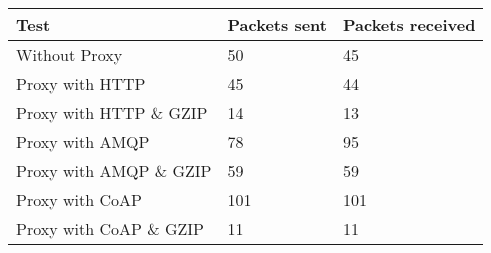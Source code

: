 \begin{tabular}{|l|l|l|}
\hline
\textbf{Test} & \textbf{Packets sent} & \textbf{Packets received} \\ \hline
Without Proxy                    &50         & 45        \\ \hline 
Proxy with HTTP                  &45         & 44        \\ \hline 
Proxy with HTTP \& GZIP          &14         & 13        \\ \hline 
Proxy with AMQP                  &78         & 95        \\ \hline 
Proxy with AMQP \& GZIP          &59         & 59        \\ \hline 
Proxy with CoAP                  &101        & 101       \\ \hline 
Proxy with CoAP \& GZIP          &11         & 11        \\ \hline 
\end{tabular}
